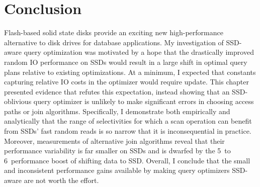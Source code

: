 \section{Conclusion}
\label{sec:FlashOpti:Conclusion}
Flash-based solid state disks provide an exciting new high-performance alternative to disk drives for database applications.
My investigation of SSD-aware query optimization was motivated by a hope that the drastically improved random IO performance on SSDs would result in a large shift in optimal query plans relative to existing optimizations.
At a minimum, I expected that constants capturing relative IO costs in the optimizer would require update.
This chapter presented evidence that refutes this expectation, instead showing that an SSD-oblivious query optimizer is unlikely to make significant errors in choosing access paths or join algorithms.
Specifically, I demonstrate both empirically and analytically that the range of selectivities for which a scan operation can benefit from SSDs' fast random reads is so narrow that it is inconsequential in practice.
Moreover, measurements of alternative join algorithms reveal that their performance variability is far smaller on SSDs and is dwarfed by the 5\texttimes~to 6\texttimes~performance boost of shifting data to SSD. 
Overall, I conclude that the small and inconsistent performance gains available by making query optimizers SSD-aware are not worth the effort.
